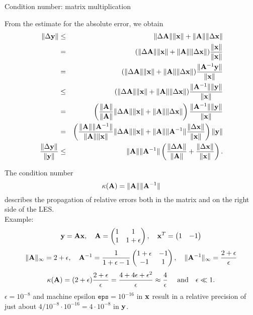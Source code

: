 \documentclass[11pt,compress,t,notes=noshow, xcolor=table]{beamer}
\begin{document}
\begin{vbframe}{Condition number: matrix multiplication}
\framebreak

From the estimate for the absolute error, we obtain
\small
\begin{eqnarray*}
\|\Delta \mathbf{y}\| &\leq& \|\Delta \mathbf{A}\|\|\mathbf{x}\| +
  \|\mathbf{A}\|\|\Delta \mathbf{x}\| \\
&=& (\|\Delta \mathbf{A}\|\|\mathbf{x}\| +
  \|\mathbf{A}\|\|\Delta \mathbf{x}\|) \frac{\|\mathbf{x}\|}{\|\mathbf{x}\|} \\
&=& (\|\Delta \mathbf{A}\|\|\mathbf{x}\| +
  \|\mathbf{A}\|\|\Delta \mathbf{x}\|) \frac{\|\mathbf{A}^{-1}\mathbf{y}\|}{\|\mathbf{x}\|} \\
&\leq& (\|\Delta \mathbf{A}\|\|\mathbf{x}\| +
  \|\mathbf{A}\|\|\Delta \mathbf{x}\|) \frac{\|\mathbf{A}^{-1}\|\|\mathbf{y}\|}{\|\mathbf{x}\|} \\
&=& \left(\frac{\|\mathbf{A}\|}{\|\mathbf{A}\|}\|\Delta \mathbf{A}\|\|\mathbf{x}\| +
  \|\mathbf{A}\|\|\Delta \mathbf{x}\|\right) \frac{\|\mathbf{A}^{-1}\|\|\mathbf{y}\|}{\|\mathbf{x}\|} \\
&=& \left(\frac{\|\mathbf{A}\|\|\mathbf{A}^{-1}\|}{\|\mathbf{A}\|\|\mathbf{x}\|}\|\Delta \mathbf{A}\|\|\mathbf{x}\| +
  \|\mathbf{A}\|\|\mathbf{A}^{-1}\|\frac{\|\Delta \mathbf{x}\|}{\|\mathbf{x}\|}\right) \|\mathbf{y}\| \\
\frac{\|\Delta \mathbf{y}\|}{\|\mathbf{y}\|} &\leq& \|\mathbf{A}\|\|\mathbf{A}^{-1}\|
  \left(\frac{\|\Delta \mathbf{A}\|}{\|\mathbf{A}\|} + \frac{\|\Delta \mathbf{x}\|}{\|\mathbf{x}\|} \right).
\end{eqnarray*}

\framebreak

The condition number
$$
\kappa(\mathbf{A}) = \|\mathbf{A}\|\|\mathbf{A}^{-1}\|
$$
describes the propagation of relative errors both in the matrix and on the right side of the LES.\\
\medskip
Example:
$$
\mathbf{y} = \mathbf{A} \mathbf{x}, \quad \mathbf{A} =
\begin{pmatrix} 1 & 1 \\ 1 & 1 + \epsilon \end{pmatrix}, \quad \mathbf{x}^T = \begin{pmatrix}  1 & -1  \end{pmatrix}
$$
$$
\|\mathbf{A}\|_{\infty} = 2 + \epsilon, \quad \mathbf{A}^{-1} = \frac{1}{1 + \epsilon - 1}
\begin{pmatrix}  1 + \epsilon & -1 \\ -1 & 1 \end{pmatrix}, \quad \|\mathbf{A}^{-1}\|_\infty = \frac{2 + \epsilon}{\epsilon}
$$
$$
\kappa(\mathbf{A}) = (2 + \epsilon)\frac{2 + \epsilon}{\epsilon} =
  \frac{4 + 4\epsilon + \epsilon^2}{\epsilon} \approx \frac{4}{\epsilon} \quad
  \text{ and}\quad \epsilon \ll 1.
$$
$\epsilon = 10^{-8}$ and machine epsilon $\texttt{eps} = 10^{-16}$ in $\mathbf{x}$ result in
a relative precision of just about $4 / 10^{-8} \cdot 10^{-16} = 4 \cdot 10^{-8}$ in
$\mathbf{y}$.
\end{vbframe}
\end{document}

